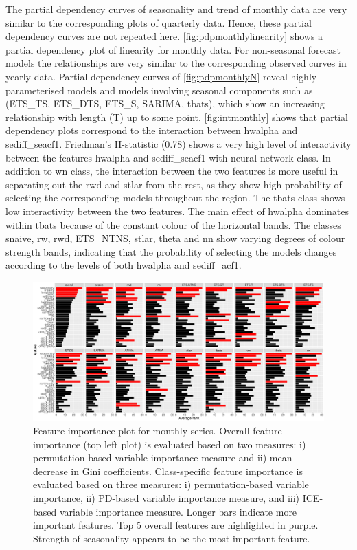 \documentclass[11pt,a4paper,]{article}
\begin{document}
The partial dependency curves of seasonality and trend of monthly data are very similar to the corresponding plots of quarterly data. Hence, these partial dependency curves are not repeated here. \autoref{fig:pdpmonthlylinearity} shows a partial dependency plot of linearity for monthly data. For non-seasonal forecast models the relationships are very similar to the corresponding observed curves in yearly data. Partial dependency curves of \autoref{fig:pdpmonthlyN} reveal highly parameterised models and models involving seasonal components such as (ETS\_TS, ETS\_DTS, ETS\_S, SARIMA, tbats), which show an increasing relationship with length (T) up to some point. \autoref{fig:intmonthly} shows that partial dependency plots correspond to the interaction between hwalpha and sediff\_seacf1. Friedman's H-statistic (0.78) shows a very high level of interactivity between the features hwalpha and sediff\_seacf1 with neural network class. In addition to wn class, the interaction between the two features is more useful in separating out the rwd and stlar from the rest, as they show high probability of selecting the corresponding models throughout the region. The tbats class shows low interactivity between the two features. The main effect of hwalpha dominates within tbats because of the constant colour of the horizontal bands. The classes snaive, rw, rwd, ETS\_NTNS, stlar, theta and nn show varying degrees of colour strength bands, indicating that the probability of selecting the models changes according to the levels of both hwalpha and sediff\_acf1.

\begin{figure}
\centering
\includegraphics{figures/vimonthly-1.pdf}
\caption{\label{fig:vimonthly}Feature importance plot for monthly series. Overall feature importance (top left plot) is evaluated based on two measures: i) permutation-based variable importance measure and ii) mean decrease in Gini coefficients. Class-specific feature importance is evaluated based on three measures: i) permutation-based variable importance, ii) PD-based variable importance measure, and iii) ICE-based variable importance measure. Longer bars indicate more important features. Top 5 overall features are highlighted in purple. Strength of seasonality appears to be the most important feature.}
\end{figure}
\end{document}
